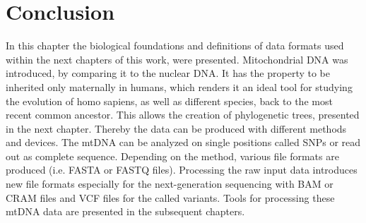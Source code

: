 \section{Conclusion}
In this chapter the biological foundations and definitions of data formats used within the next chapters of this work, were presented. Mitochondrial DNA was introduced, by comparing it to the nuclear DNA. It has the property to be inherited only maternally in humans, which renders it an ideal tool for studying the evolution of homo sapiens, as well as different species, back to the most recent common ancestor. This allows the creation of phylogenetic trees, presented in the next chapter. Thereby the data can be produced with different methods and devices. The mtDNA can be analyzed on single positions called SNPs or read out as complete sequence. Depending on the method, various file formats are produced (i.e. FASTA or FASTQ files). Processing the raw input data introduces new file formats especially for the next-generation sequencing with BAM or CRAM files and VCF files for the called variants. Tools for processing these mtDNA data are presented in the subsequent chapters.